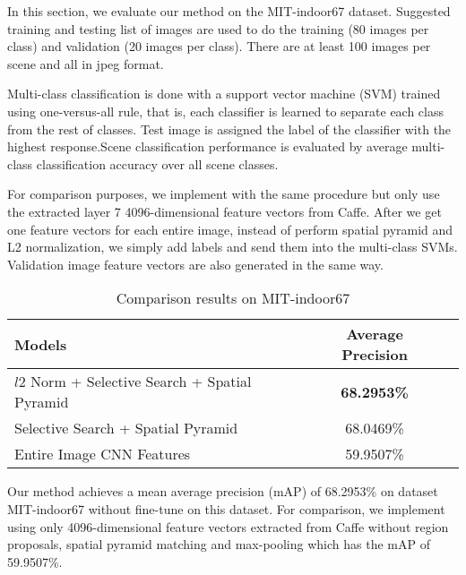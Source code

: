 
In this section, we evaluate our method on the MIT-indoor67 dataset. Suggested training and
testing list of images are used to do the training (80 images per class)
and validation (20 images per class). There are at least 100 images per
scene and all in jpeg format.

Multi-class classification is done with a support vector machine (SVM) trained
using one-versus-all rule, that is, each classifier is learned to separate each
class from the rest of classes. Test image is assigned the label of the
classifier with the highest response.Scene classification performance is
evaluated by average multi-class classification accuracy over all scene classes.

For comparison purposes, we implement with the same procedure but only use
the extracted layer 7 4096-dimensional feature vectors from Caffe. After we get
one feature vectors for each entire image, instead of perform spatial pyramid
and L2 normalization, we simply add labels and send them into the multi-class
SVMs. Validation image feature vectors are also generated in the same way.

\begin{table*}[ht]
	\caption{Comparison results on MIT-indoor67}
	\centering
	\begin{tabular}{l c c}
	\hline \hline
	Models                & Average Precision \\ \hline
	$l2$ Norm + Selective Search + Spatial Pyramid & {\bf{68.2953\%}} \\
	Selective Search + Spatial Pyramid & 68.0469\% \\
        Entire Image CNN Features & 59.9507\% \\
	\hline
	\end{tabular}
	\label{tab:overall}
\end{table*}

Our
method achieves a mean average precision (mAP) of 68.2953\% on dataset
MIT-indoor67\cite{Quattoni:2009:RIS} without fine-tune on this dataset.
For comparison, we implement using only 4096-dimensional feature vectors
extracted from Caffe without region proposals, spatial pyramid matching 
and max-pooling which has the mAP of 59.9507\%.

